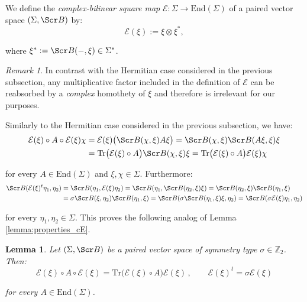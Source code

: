 \documentclass[10pt,a4paper,twoside,reqno]{amsart}
\theoremstyle{plain}
\newtheorem{lemma}[thm]{Lemma}
\theoremstyle{definition}
\theoremstyle{remark}
\newtheorem{remark}[thm]{Remark}
\newcommand{\End}{\mathrm{End}}
\def\Z{\mathbb{Z}}
\newcommand{\Tr}{\mathrm{Tr}}
\def\scB{\Scr B}
\def\cE{\mathcal{E}}
\begin{document}
\noindent
We define the \emph{complex-bilinear square map} $\cE\colon\Sigma\to\End(\Sigma)$ of a paired vector space $(\Sigma,\scB)$ by:
\begin{equation*}
\cE(\xi):= \xi\otimes\xi^{\ast},
\end{equation*}

\noindent
where $\xi^*:=\scB(-,\xi)\in\Sigma^*$. 

\begin{remark}
In contrast with the Hermitian case considered in the previous subsection, any multiplicative factor included in the definition of $\cE$ can be reabsorbed by a \emph{complex} homothety of $\xi$ and therefore is irrelevant for our purposes.
\end{remark}

\noindent
Similarly to the Hermitian case considered in the previous subsection, we have:
\begin{align*}
    \cE(\xi) \circ A \circ \cE(\xi)\chi  &=  \cE(\xi) \big(\scB(\chi,\xi) A\xi\big) = \scB(\chi,\xi)\scB(A\xi,\xi) \xi\\
    & = \Tr\big(\cE(\xi) \circ A \big) \scB(\chi,\xi)\xi=\Tr\big(\cE(\xi) \circ A\big)\cE(\xi) \chi
\end{align*}

\noindent
for every $A\in \End(\Sigma)$ and $\xi, \chi\in\Sigma$. Furthermore:  
\begin{align*}
    \scB(\cE(\xi)^t \eta_1,\eta_2) &= \scB(\eta_1,\cE(\xi)\eta_2)=\scB(\eta_1, \scB(\eta_2,\xi)\xi)= \scB(\eta_2,\xi)\scB(\eta_1,\xi)\\
    & = \sigma\scB(\xi,\eta_2)\scB(\eta_1,\xi)=\scB(\sigma \scB(\eta_1,\xi)\xi,\eta_2)=\scB(\sigma \cE(\xi)\eta_1,\eta_2)
\end{align*}

\noindent
for every $\eta_1, \eta_2\in\Sigma$. This proves the following analog of Lemma \ref{lemma:properties_cE}.
\begin{lemma}
\label{lemma:propertiesbilinearI}
Let $(\Sigma,\scB)$ be a paired vector space of symmetry type $\sigma\in\Z_2$. Then:
\begin{equation*}
\cE (\xi)\circ A \circ \cE (\xi) =\Tr\big(\cE (\xi)\circ A \big)\cE (\xi)\, , \qquad  \cE(\xi)^t = \sigma \cE (\xi)
\end{equation*}

\noindent
for every $A\in \End(\Sigma)$.
\end{lemma}
\end{document}
